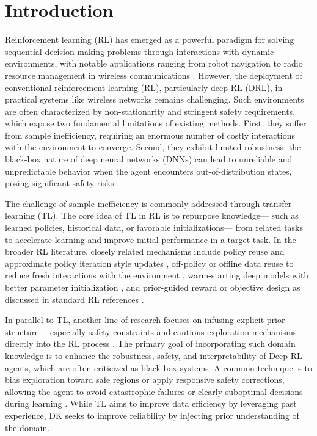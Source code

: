 \documentclass{IEEEtran}
\begin{document}
\section{Introduction}
Reinforcement learning (RL) has emerged as a powerful paradigm for solving sequential decision-making problems through interactions with dynamic environments, with notable applications ranging from robot navigation \cite{robotlocomotion} to radio resource management in wireless communications \cite{RRM}. However, the deployment of conventional reinforcement learning (RL), particularly deep RL (DRL), in practical systems like wireless networks remains challenging. Such environments are often characterized by non-stationarity and stringent safety requirements, which expose two fundamental limitations of existing methods. First, they suffer from sample inefficiency, requiring an enormous number of costly interactions with the environment to converge. Second, they exhibit limited robustness: the black-box nature of deep neural networks (DNNs) can lead to unreliable and unpredictable behavior when the agent encounters out-of-distribution states, posing significant safety risks.

The challenge of sample inefficiency is commonly addressed through transfer learning (TL). The core idea of TL in RL is to repurpose knowledge--- such as learned policies, historical data, or favorable initializations--- from related tasks to accelerate learning and improve initial performance in a target task. In the broader RL literature, closely related mechanisms include policy reuse and approximate policy iteration style updates \cite{boundedJ1}, off-policy or offline data reuse to reduce fresh interactions with the environment \cite{SCAOPO,offlineCRLrecommendedbyreviewer2}, warm-starting deep models with better parameter initialization \cite{initialization}, and prior-guided reward or objective design as discussed in standard RL references \cite{RLintroduction,DRL}.

In parallel to TL, another line of research focuses on infusing explicit prior structure--- especially safety constraints and cautious exploration mechanisms--- directly into the RL process \cite{CPO,CLQset,reviewer1_1_3}. The primary goal of incorporating such domain knowledge is to enhance the robustness, safety, and interpretability of Deep RL agents, which are often criticized as black-box systems. A common technique is to bias exploration toward safe regions or apply responsive safety corrections, allowing the agent to avoid catastrophic failures or clearly suboptimal decisions during learning \cite{SCAOPO17,SCAOPO18,PPOLagTRPOLag}. While TL aims to improve data efficiency by leveraging past experience, DK seeks to improve reliability by injecting prior understanding of the domain.
\end{document}
